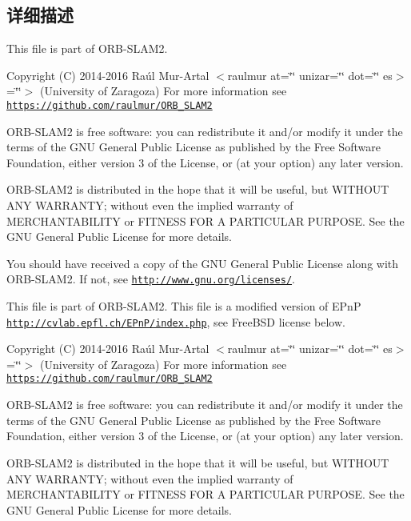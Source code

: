 \subsection{详细描述}
This file is part of O\-R\-B-\/\-S\-L\-A\-M2.

Copyright (C) 2014-\/2016 Raúl Mur-\/\-Artal $<$raulmur at=\char`\"{}\char`\"{} unizar=\char`\"{}\char`\"{} dot=\char`\"{}\char`\"{} es$>$=\char`\"{}\char`\"{}$>$ (University of Zaragoza) For more information see \href{https://github.com/raulmur/ORB_SLAM2}{\tt https\-://github.\-com/raulmur/\-O\-R\-B\-\_\-\-S\-L\-A\-M2}

O\-R\-B-\/\-S\-L\-A\-M2 is free software\-: you can redistribute it and/or modify it under the terms of the G\-N\-U General Public License as published by the Free Software Foundation, either version 3 of the License, or (at your option) any later version.

O\-R\-B-\/\-S\-L\-A\-M2 is distributed in the hope that it will be useful, but W\-I\-T\-H\-O\-U\-T A\-N\-Y W\-A\-R\-R\-A\-N\-T\-Y; without even the implied warranty of M\-E\-R\-C\-H\-A\-N\-T\-A\-B\-I\-L\-I\-T\-Y or F\-I\-T\-N\-E\-S\-S F\-O\-R A P\-A\-R\-T\-I\-C\-U\-L\-A\-R P\-U\-R\-P\-O\-S\-E. See the G\-N\-U General Public License for more details.

You should have received a copy of the G\-N\-U General Public License along with O\-R\-B-\/\-S\-L\-A\-M2. If not, see \href{http://www.gnu.org/licenses/}{\tt http\-://www.\-gnu.\-org/licenses/}.

This file is part of O\-R\-B-\/\-S\-L\-A\-M2. This file is a modified version of E\-Pn\-P \href{http://cvlab.epfl.ch/EPnP/index.php}{\tt http\-://cvlab.\-epfl.\-ch/\-E\-Pn\-P/index.\-php}, see Free\-B\-S\-D license below.

Copyright (C) 2014-\/2016 Raúl Mur-\/\-Artal $<$raulmur at=\char`\"{}\char`\"{} unizar=\char`\"{}\char`\"{} dot=\char`\"{}\char`\"{} es$>$=\char`\"{}\char`\"{}$>$ (University of Zaragoza) For more information see \href{https://github.com/raulmur/ORB_SLAM2}{\tt https\-://github.\-com/raulmur/\-O\-R\-B\-\_\-\-S\-L\-A\-M2}

O\-R\-B-\/\-S\-L\-A\-M2 is free software\-: you can redistribute it and/or modify it under the terms of the G\-N\-U General Public License as published by the Free Software Foundation, either version 3 of the License, or (at your option) any later version.

O\-R\-B-\/\-S\-L\-A\-M2 is distributed in the hope that it will be useful, but W\-I\-T\-H\-O\-U\-T A\-N\-Y W\-A\-R\-R\-A\-N\-T\-Y; without even the implied warranty of M\-E\-R\-C\-H\-A\-N\-T\-A\-B\-I\-L\-I\-T\-Y or F\-I\-T\-N\-E\-S\-S F\-O\-R A P\-A\-R\-T\-I\-C\-U\-L\-A\-R P\-U\-R\-P\-O\-S\-E. See the G\-N\-U General Public License for more details.

